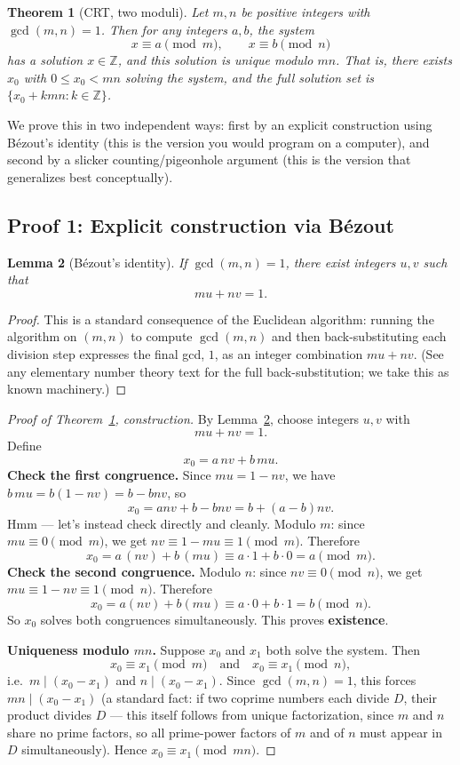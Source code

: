 \documentclass[11pt]{article}
\newtheorem{theorem}{Theorem}[section]
\newtheorem{lemma}[theorem]{Lemma}
\theoremstyle{definition}
\theoremstyle{remark}
\newcommand{\Z}{\mathbb{Z}}
\begin{document}
\begin{theorem}[CRT, two moduli]\label{thm:crt2}
Let $m,n$ be positive integers with $\gcd(m,n)=1$. Then for any integers $a,b$, the system
\[
x \equiv a \pmod m, \qquad x \equiv b \pmod n
\]
has a solution $x \in \Z$, and this solution is unique modulo $mn$. That is, there exists $x_0$ with $0 \le x_0 < mn$ solving the system, and the full solution set is $\{x_0 + kmn : k \in \Z\}$.
\end{theorem}

We prove this in two independent ways: first by an explicit construction using Bézout's identity (this is the version you would program on a computer), and second by a slicker counting/pigeonhole argument (this is the version that generalizes best conceptually).

\subsection{Proof 1: Explicit construction via Bézout}

\begin{lemma}[Bézout's identity]\label{lem:bezout}
If $\gcd(m,n) = 1$, there exist integers $u,v$ such that
\[
mu + nv = 1.
\]
\end{lemma}
\begin{proof}
This is a standard consequence of the Euclidean algorithm: running the algorithm on $(m,n)$ to compute $\gcd(m,n)$ and then back-substituting each division step expresses the final gcd, $1$, as an integer combination $mu+nv$. (See any elementary number theory text for the full back-substitution; we take this as known machinery.)
\end{proof}

\begin{proof}[Proof of Theorem~\ref{thm:crt2}, construction]
By Lemma~\ref{lem:bezout}, choose integers $u,v$ with
\[
mu + nv = 1.
\]
Define
\[
x_0 = a\,nv + b\,mu.
\]
\textbf{Check the first congruence.} Since $mu = 1 - nv$, we have $b\,mu = b(1-nv) = b - bnv$, so
\[
x_0 = anv + b - bnv = b + (a-b)nv.
\]
Hmm — let's instead check directly and cleanly. Modulo $m$: since $mu \equiv 0 \pmod m$, we get $nv \equiv 1 - mu \equiv 1 \pmod m$. Therefore
\[
x_0 = a\,(nv) + b\,(mu) \equiv a\cdot 1 + b\cdot 0 = a \pmod m.
\]
\textbf{Check the second congruence.} Modulo $n$: since $nv\equiv 0\pmod n$, we get $mu \equiv 1 - nv \equiv 1\pmod n$. Therefore
\[
x_0 = a(nv) + b(mu) \equiv a\cdot 0 + b\cdot 1 = b \pmod n.
\]
So $x_0$ solves both congruences simultaneously. This proves \textbf{existence}.

\textbf{Uniqueness modulo $mn$.} Suppose $x_0$ and $x_1$ both solve the system. Then
\[
x_0 \equiv x_1 \pmod m \quad\text{and}\quad x_0 \equiv x_1 \pmod n,
\]
i.e.\ $m \mid (x_0 - x_1)$ and $n \mid (x_0-x_1)$. Since $\gcd(m,n)=1$, this forces $mn \mid (x_0-x_1)$ (a standard fact: if two coprime numbers each divide $D$, their product divides $D$ — this itself follows from unique factorization, since $m$ and $n$ share no prime factors, so all prime-power factors of $m$ and of $n$ must appear in $D$ simultaneously). Hence $x_0 \equiv x_1 \pmod{mn}$.
\end{proof}
\end{document}
